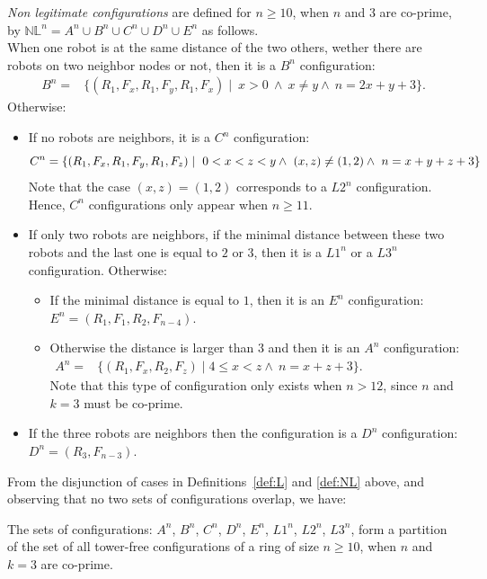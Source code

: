 \begin{definition}
  \label{def:NL} \emph{Non legitimate configurations} are defined for
  $n\geq 10$, when $n$ and $3$ are co-prime, by $\mathbb{NL}^n = A^n \cup B^n \cup C^n \cup D^n \cup
  E^n$ as follows.\\ When one robot is at the same distance of the two
  others, wether there are robots on two neighbor nodes or not, then it is a $B^n$ configuration: 
  $$\begin{array}{ll}B^n = &\{(R_1, F_x, R_1, F_y, R_1, F_x) \mid \ 
x > 0 \ \wedge \ x\neq y  \wedge \ n = 2x+y+3\}. \end{array}$$
  Otherwise: 
\begin{itemize}%
\item If no robots are neighbors, it is a $C^n$ configuration: 
 $$\noindent C^n=\{(R_1, F_x, R_1, F_y, R_1, F_z) \mid  \ 
   0< x<z<y \wedge \ (x, z) \neq (1, 2)\wedge \ n=x+y+z+3\}$$
 Note that the case $(x, z)=(1, 2)$ corresponds to a $L2^n$ configuration. 
 Hence, $C^n$ configurations only appear when $n\geq 11$.
\item If only two robots are neighbors, if the minimal distance
  between these two robots and the last one is equal to $2$ or $3$, 
  then it is a $L1^n$ or a $L3^n$ configuration. Otherwise: 
		\begin{itemize}
		\item If the minimal distance is equal to $1$, then it
                  is an $E^n$ configuration: \\ $E^n=(R_1, F_1, R_2, 
                  F_{n-4}).$
		\item Otherwise the distance is larger than $3$ and
                  then it is an $A^n$ configuration: 
 $\begin{array}{ll}A^n=&\{(R_1, F_x,  R_2, F_z) 
   \mid 4 \leq x < z \wedge \ n = x+z+3\}. 
\end{array}$\\
 Note that this type of configuration only exists when $n>12$, since
 $n$ and $k=3$ must be co-prime.
		\end{itemize}
	\item If the three robots are neighbors
		then the configuration is a $D^n$ configuration: \\
		$D^n=(R_3, F_{n-3}).$
\end{itemize}
\end{definition}

From the disjunction of cases in Definitions~\ref{def:L} and
\ref{def:NL} above, and observing that no two sets of
configurations overlap, we have: 
\begin{proposition}\label{prop: partition}
  The sets of configurations: $A^n$, $B^n$, $C^n$, $D^n$, $E^n$, 
  $L1^n$, $L2^n$, $L3^n$, form a partition of the set of all
  tower-free configurations of a ring of size $n \geq 10$, when $n$
  and $k=3$ are co-prime.
\end{proposition}

